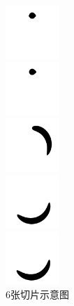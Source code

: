\begin{figure}[H]
  \centering
  \begin{varwidth}[t]{\textwidth}
    \vspace{0pt}
    \includegraphics[height=2cm]{images/Z=0.jpg}
  \end{varwidth}
  \quad
  \begin{varwidth}[t]{\textwidth}
    \vspace{0pt}
    \includegraphics[height=2cm]{images/Z=1.jpg}
  \end{varwidth}
    \quad
  \begin{varwidth}[t]{\textwidth}
    \vspace{0pt}
    \includegraphics[height=2cm]{images/Z=48.jpg}
  \end{varwidth}
    \quad
  \begin{varwidth}[t]{\textwidth}
    \vspace{0pt}
    \includegraphics[height=2cm]{images/Z=98.jpg}
  \end{varwidth}
    \quad
  \begin{varwidth}[t]{\textwidth}
    \vspace{0pt}
    \includegraphics[height=2cm]{images/Z=99.jpg}
  \end{varwidth}
  \caption{6张切片示意图}
  \label{6张切片示意图}
\end{figure}

